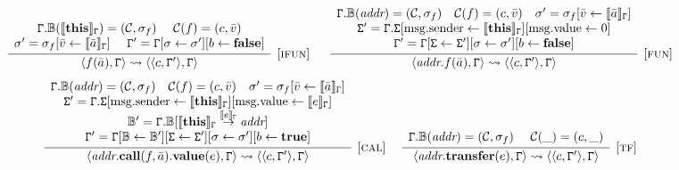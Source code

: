 \begin{figure}[t]
\centering
$$
\infer[{[\rname{ifun}]}]{\conf{f(\bar{a}),\cstate} \leadsto \conf{\conf{c,\cstate'},\cstate}}
{
	\begin{array}{c}	
	\cstate.\mathbb{B}(\eval{\textbf{this}}_{\cstate}) = (\mathcal{C},\lstate_f)~~~~
	\mathcal{C}(f) = (c,\bar{v})
	\\
	\lstate' = \lstate_f[\bar{v} \leftarrow \eval{\bar{a}}_\cstate]
	~~~~
	\cstate' = \cstate[\lstate \leftarrow \lstate'][b \leftarrow \textbf{false}]
	\end{array}
}
~~~~~
\infer[{[\rname{fun}]}]{\conf{\textit{addr}.f(\bar{a}),\cstate} \leadsto \conf{\conf{c,\cstate'},\cstate}}
{
	\begin{array}{c}	
	\cstate.\mathbb{B}(\textit{addr}) = (\mathcal{C},\lstate_f)~~~
	\mathcal{C}(f) = (c,\bar{v})~~~
	\lstate' = \lstate_f[\bar{v} \leftarrow \eval{\bar{a}}_{\cstate}]
	\\
	\gstate' = \cstate.\gstate[\textrm{msg.sender} \leftarrow \eval{\textbf{this}}_{\cstate}][\textrm{msg.value} \leftarrow 0]
	\\
	\cstate' = \cstate[\gstate \leftarrow \gstate'][\lstate \leftarrow \lstate'][b \leftarrow \textbf{false}]
	\end{array}
}
$$
\vspace{-0.5em}
$$
\infer[{[\rname{cal}]}]{\conf{\textit{addr}.\textbf{call}(f,\bar{a}).\textbf{value}(e),\cstate} \leadsto \conf{\conf{c,\cstate'},\cstate}}
{
	\begin{array}{c}	
	\cstate.\mathbb{B}(\textit{addr}) = (\mathcal{C},\lstate_f)
	~~~
	\mathcal{C}(f) = (c,\bar{v})~~~
	\lstate' = \lstate_f[\bar{v} \leftarrow \eval{\bar{a}}_{\cstate}]
	\\
	\gstate' = \cstate.\gstate[\textrm{msg.sender} \leftarrow \eval{\textbf{this}}_{\cstate}][\textrm{msg.value} \leftarrow \eval{e}_{\cstate}]
	\\
	\chain' = \cstate.\chain[\eval{\textbf{this}}_{\cstate} \stackrel{\eval{e}_{\cstate}}{\rightarrow} \textit{addr}]
	\\
	\cstate' = \cstate[\chain \leftarrow \chain'][\gstate \leftarrow \gstate'][\lstate \leftarrow \lstate'][b \leftarrow \textbf{true}]
	\end{array}
}
~~~~
\infer[{[\rname{tf}]}]{\conf{\textit{addr}.\textbf{transfer}(e),\cstate} \leadsto \conf{\conf{c,\cstate'},\cstate}}
{
	\begin{array}{c}	
	\cstate.\mathbb{B}(\textit{addr}) = (\mathcal{C},\lstate_f)~~~~
	\mathcal{C}(\_) = (c,\_)
	\\

\end{array}}$$
\end{figure}
